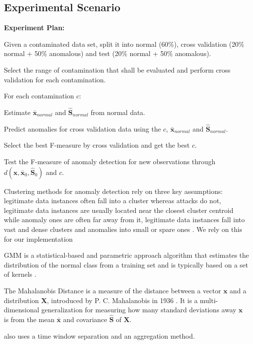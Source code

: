 \documentclass[review]{elsarticle}
\begin{document}
\subsection{Experimental Scenario}
\label{sec:AnalyzedScenario}

\textbf{Experiment Plan:}

Given a contaminated data set, split it into normal (60\%), cross validation (20\% normal + 50\% anomalous) and test (20\% normal + 50\% anomalous).

Select the range of contamination that shall be evaluated and perform cross validation for each contamination. 

For each contamination $c$:

Estimate $\boldsymbol{\bar{x}}_{normal}$ and $\boldsymbol{\hat{S}}_{normal}$ from normal data.

Predict anomalies for cross validation data using the $c$, $\boldsymbol{\bar{x}}_{normal}$ and $\boldsymbol{\hat{S}}_{normal}$.

Select the best F-measure by cross validation and get the best $c$.

Test the F-measure of anomaly detection for new observations through $d(\boldsymbol{x},\bar{\boldsymbol{x}}_0, \boldsymbol{\hat{S}}_0)$ and $c$.

Clustering methods for anomaly detection rely on three key assumptions: legitimate data instances often fall into a cluster whereas attacks do not, legitimate data instances are usually located near the closest cluster centroid while anomaly ones are often far away from it, legitimate data instances fall into vast and dense clusters and anomalies into small or spare ones \cite{ahmed2016survey, moustafa2019holistic}. We rely on this for our implementation

GMM is a statistical-based and parametric approach algorithm that estimates the distribution of the normal class from a training set and is typically based on a set of kernels \cite{moustafa2019holistic}.

The Mahalanobis Distance is a measure of the distance between a vector $\boldsymbol{x}$ and a distribution $\boldsymbol{X}$, introduced by P. C. Mahalanobis in 1936 \cite{mahalanobis1936md}. It is a multi-dimensional generalization for measuring how many standard deviations away $\boldsymbol{x}$ is from the mean $\boldsymbol{\bar{x}}$ and covariance $\boldsymbol{\hat{S}}$ of $\boldsymbol{X}$.

\cite{garcia2014empirical} also uses a time window separation and an aggregation method.
\end{document}
